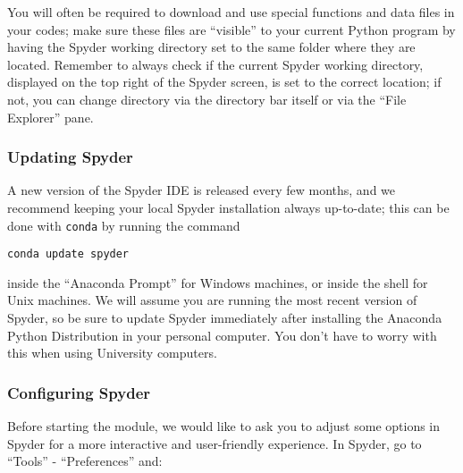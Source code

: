 You will often be required to download and use special functions and data files in your codes; make sure these files are ``visible'' to your current Python program by having the Spyder working directory set to the same folder where they are located. Remember to always check if the current Spyder working directory, displayed on the top right of the Spyder screen, is set to the correct location; if not, you can change directory via the directory bar itself or via the ``File Explorer'' pane.

\subsubsection{Updating Spyder}

A new version of the Spyder IDE is released every few months, and we recommend keeping your local Spyder installation always up-to-date; this can be done with {\tt conda} by running the command

\begin{lstlisting}[frame=single]
conda update spyder
\end{lstlisting}

inside the ``Anaconda Prompt'' for Windows machines, or inside the shell for Unix machines. We will assume you are running the most recent version of Spyder, so be sure to update Spyder immediately after installing the Anaconda Python Distribution in your personal computer. You don't have to worry with this when using University computers.

\subsubsection{Configuring Spyder}

Before starting the module, we would like to ask you to adjust some options in Spyder for a more interactive and user-friendly experience. In Spyder, go to ``Tools'' - ``Preferences'' and:

